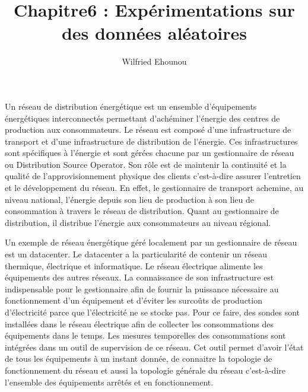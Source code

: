 \documentclass[onecolumn, 12pt]{book}
\title{Chapitre6 : Exp\'erimentations sur des donn\'ees al\'eatoires}
\author{Wilfried Ehounou}
\date{\oldstylenums{\today}}
\begin{document}
Un r\'eseau de distribution \'energ\'etique est un ensemble d'\'equipements \'energ\'etiques interconnect\'es permettant d'ach\'eminer l'\'energie des centres de production aux consommateurs. 
Le r\'eseau est compos\'e d'une infrastructure de transport et d'une infrastructure de distribution de l'\'energie. Ces infrastructures sont sp\'ecifiques \`a l'\'energie et sont g\'er\'ees chacune par un gestionnaire de r\'eseau ou Distribution Source Operator. Son r\^ole est de maintenir la continuit\'e et la qualit\'e de l'approvisionnement physique des clients c'est-\`a-dire assurer l'entretien et le d\'eveloppement du r\'eseau. 
En effet, le gestionnaire de transport achemine, au niveau national, l'\'energie depuis son lieu de production \`a son lieu de consommation \`a travers le r\'eseau de distribution. Quant au gestionnaire de distribution, il distribue l'\'energie aux consommateurs au niveau r\'egional.
\newline

Un exemple de r\'eseau \'energ\'etique g\'er\'e localement par un gestionnaire de r\'eseau est un datacenter. Le datacenter a la particularit\'e de contenir un r\'eseau thermique, \'electrique et informatique. Le r\'eseau \'electrique alimente les \'equipements des autres r\'eseaux. La connaissance de son infrastructure est indispensable pour le gestionnaire afin
de fournir  la puissance n\'ecessaire au fonctionnement d'un \'equipement et 
 d'\'eviter les surco\^uts de production d'\'electricit\'e parce que l'\'electricit\'e ne se stocke pas.
Pour ce faire, 
des sondes sont install\'ees dans le r\'eseau \'electrique afin de collecter les consommations des \'equipements dans le temps. Les mesures temporelles des consommations sont int\'egr\'ees dans un outil de supervision de ce r\'eseau. Cet outil permet d'avoir l'\'etat de tous les \'equipements \`a un instant donn\'ee, de connaitre la topologie de fonctionnement du r\'eseau et aussi la topologie g\'en\'erale du r\'eseau c'est-\`a-dire l'ensemble des \'equipements arr\^et\'es et en fonctionnement.
\newline
\end{document}
